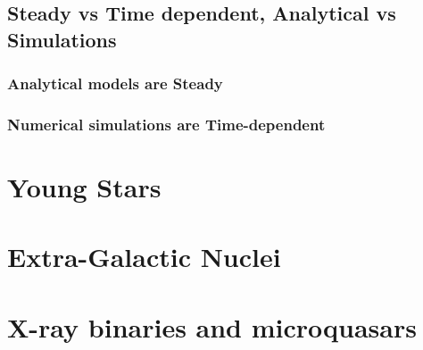 \documentclass[10pt,a4paper]{article}
\begin{document}
\subsection{Steady vs Time dependent, Analytical vs Simulations}
\subsubsection{Analytical models are Steady}
\subsubsection{Numerical simulations are Time-dependent}

\section{Young Stars}
\section{Extra-Galactic Nuclei}
\section{X-ray binaries and microquasars}
\end{document}
